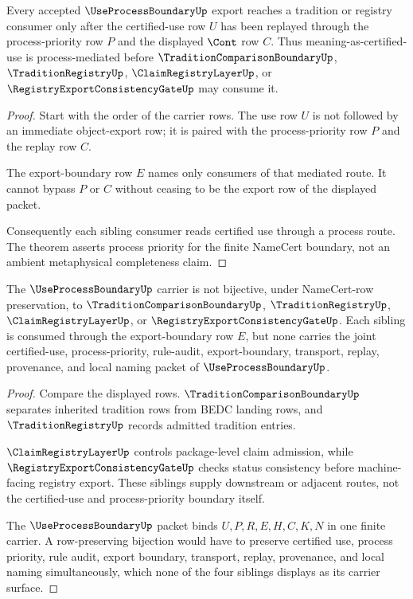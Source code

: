 \begin{theorem}
\label{thm:use-process-boundary-process-priority}
Every accepted $\UseProcessBoundaryUp$ export reaches a tradition or registry consumer only after the certified-use row $U$ has been replayed through the process-priority row $P$ and the displayed $\Cont$ row $C$. Thus meaning-as-certified-use is process-mediated before $\TraditionComparisonBoundaryUp$, $\TraditionRegistryUp$, $\ClaimRegistryLayerUp$, or $\RegistryExportConsistencyGateUp$ may consume it.
\end{theorem}
\begin{proof}
Start with the order of the carrier rows. The use row $U$ is not followed by an immediate object-export row; it is paired with the process-priority row $P$ and the replay row $C$.

The export-boundary row $E$ names only consumers of that mediated route. It cannot bypass $P$ or $C$ without ceasing to be the export row of the displayed packet.

Consequently each sibling consumer reads certified use through a process route. The theorem asserts process priority for the finite NameCert boundary, not an ambient metaphysical completeness claim.
\end{proof}

\begin{theorem}
\label{thm:use-process-boundary-sibling-independence}
The $\UseProcessBoundaryUp$ carrier is not bijective, under NameCert-row preservation, to $\TraditionComparisonBoundaryUp$, $\TraditionRegistryUp$, $\ClaimRegistryLayerUp$, or $\RegistryExportConsistencyGateUp$. Each sibling is consumed through the export-boundary row $E$, but none carries the joint certified-use, process-priority, rule-audit, export-boundary, transport, replay, provenance, and local naming packet of $\UseProcessBoundaryUp$.
\end{theorem}
\begin{proof}
Compare the displayed rows. $\TraditionComparisonBoundaryUp$ separates inherited tradition rows from BEDC landing rows, and $\TraditionRegistryUp$ records admitted tradition entries.

$\ClaimRegistryLayerUp$ controls package-level claim admission, while $\RegistryExportConsistencyGateUp$ checks status consistency before machine-facing registry export. These siblings supply downstream or adjacent routes, not the certified-use and process-priority boundary itself.

The $\UseProcessBoundaryUp$ packet binds $U,P,R,E,H,C,K,N$ in one finite carrier. A row-preserving bijection would have to preserve certified use, process priority, rule audit, export boundary, transport, replay, provenance, and local naming simultaneously, which none of the four siblings displays as its carrier surface.
\end{proof}

